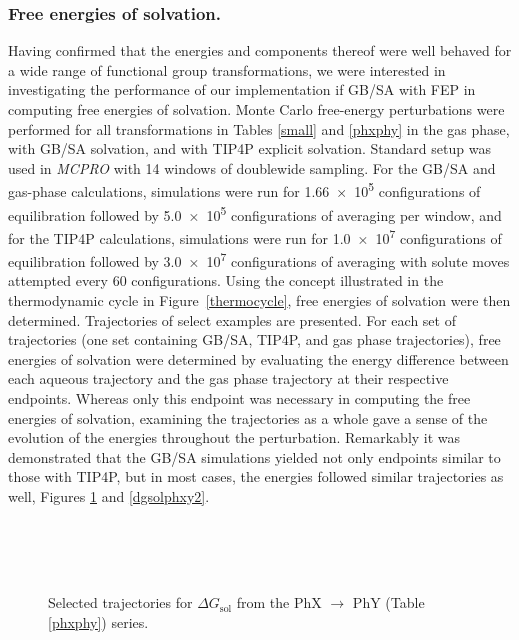 \documentclass[12pt]{report}
\def\figlab{Figure}\def\figslab{\figlab s}
\newcommand*\fig[1]{\figlab~\ref{#1}}
\begin{document}

\subsubsection{Free energies of solvation.}

Having confirmed that the energies and components thereof were well behaved for a wide range of functional group transformations, we were interested in investigating the performance of our implementation if GB/SA with FEP in computing free energies of solvation. Monte Carlo free-energy perturbations were performed for all transformations in Tables \ref{small} and \ref{phxphy} in the gas phase, with GB/SA solvation, and with TIP4P explicit solvation. Standard setup was used in \textit{MCPRO} with 14 windows of doublewide sampling. For the GB/SA and gas-phase calculations, simulations were run for \num{1.66e5} configurations of equilibration followed by \num{5.0e5} configurations of averaging per window, and for the TIP4P calculations, simulations were run for \num{1.0e7} configurations of equilibration followed by \num{3.0e7} configurations of averaging with solute moves attempted every 60 configurations. Using the concept illustrated in the thermodynamic cycle in \fig{thermocycle}, free energies of solvation were then determined. Trajectories of select examples are presented. For each set of trajectories (one set containing GB/SA, TIP4P, and gas phase trajectories), free energies of solvation were determined by evaluating the energy difference between each aqueous trajectory and the gas phase trajectory at their respective endpoints. Whereas only this endpoint was necessary in computing the free energies of solvation, examining the trajectories as a whole gave a sense of the evolution of the energies throughout the perturbation. Remarkably it was demonstrated that the GB/SA simulations yielded not only endpoints similar to those with TIP4P, but in most cases, the energies followed similar trajectories as well, Figures \ref{dgsolphxy1} and \ref{dgsolphxy2}.

\begin{figure}[p]
\centering
\hspace*{-1.3cm}\\
\hspace*{-1.3cm}\\
\hspace*{-1.3cm}\\
\caption{Selected trajectories for $\Delta G_\textrm{sol}$ from the PhX $\longrightarrow$ PhY (Table \ref{phxphy}) series.}
\label{dgsolphxy1}
\end{figure}
\end{document}
